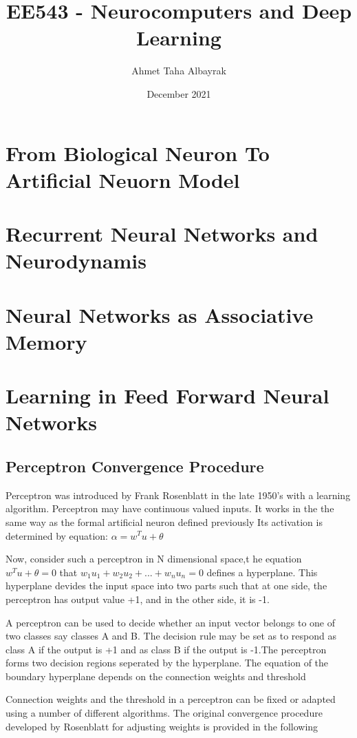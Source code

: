 \documentclass[12pt, a4paper, twoside]{book}
\title{EE543 - Neurocomputers and Deep Learning}
\author{Ahmet Taha Albayrak}
\date{December 2021}
\begin{document}
\begin{titlepage}
\maketitle
\end{titlepage}

\chapter{From Biological Neuron To Artificial Neuorn Model}
\chapter{Recurrent Neural Networks and Neurodynamis}
\chapter{Neural Networks as Associative Memory}

\chapter{Learning in Feed Forward Neural Networks}
\section{Perceptron Convergence Procedure}


Perceptron was introduced by Frank Rosenblatt in the late 1950's with a learning algorithm.
Perceptron may have continuous valued inputs.
It works in the the same way as the formal artificial neuron defined previously
Its activation is determined by equation: $\alpha= w^Tu+\theta $

Now, consider such a perceptron in N dimensional space,t he equation $w^Tu + \theta = 0$ that 
$w_1u_1 + w_2u_2 +...+w_nu_n=0$ defines a hyperplane. This hyperplane devides the input space into two parts
such that at one side, the perceptron has output value +1, and in the other side, it is -1.

A perceptron can be used to decide whether an input vector belongs to one of two classes say classes A and B.
The decision rule may be set as to respond as class A if the output is +1 and as class B if the output is -1.The perceptron forms two decision regions seperated by the hyperplane. The equation of the boundary hyperplane depends on the connection weights and threshold 

Connection weights and the threshold in a perceptron can be fixed or adapted using a number of different algorithms.
The original convergence procedure developed by Rosenblatt for adjusting weights is provided in the following
\pagebreak
\end{document}
